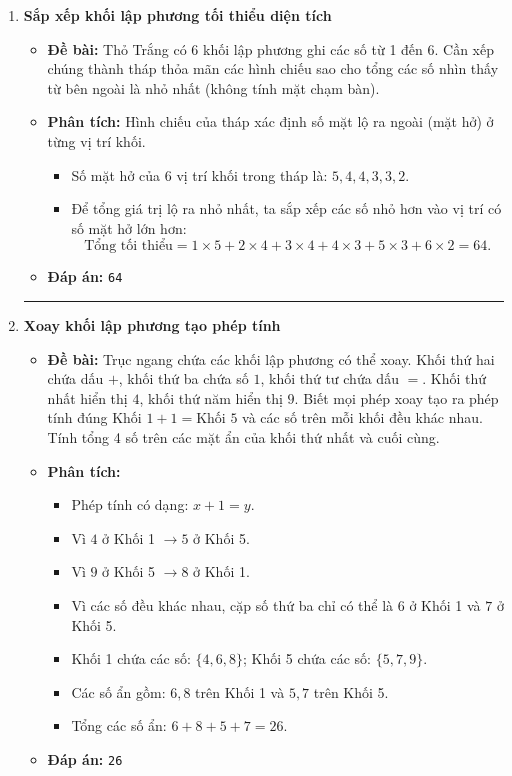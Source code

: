 \documentclass[11pt,a4paper]{article}
\begin{document}
\begin{enumerate}[label=\textbf{Câu \arabic*:}, leftmargin=*]
\item \textbf{Sắp xếp khối lập phương tối thiểu diện tích}
    \begin{itemize}
        \item \textbf{Đề bài:} Thỏ Trắng có 6 khối lập phương ghi các số từ 1 đến 6. Cần xếp chúng thành tháp thỏa mãn các hình chiếu sao cho tổng các số nhìn thấy từ bên ngoài là nhỏ nhất (không tính mặt chạm bàn).
        \item \textbf{Phân tích:}
            Hình chiếu của tháp xác định số mặt lộ ra ngoài (mặt hở) ở từng vị trí khối.
            \begin{itemize}
                \item Số mặt hở của 6 vị trí khối trong tháp là: $5, 4, 4, 3, 3, 2$.
                \item Để tổng giá trị lộ ra nhỏ nhất, ta sắp xếp các số nhỏ hơn vào vị trí có số mặt hở lớn hơn:
                    $$\text{Tổng tối thiểu} = 1 \times 5 + 2 \times 4 + 3 \times 4 + 4 \times 3 + 5 \times 3 + 6 \times 2 = 64.$$
            \end{itemize}
        \item \textbf{Đáp án:} \texttt{64}
    \end{itemize}

\hrule
\vspace{0.5cm}

\item \textbf{Xoay khối lập phương tạo phép tính}
    \begin{itemize}
        \item \textbf{Đề bài:} Trục ngang chứa các khối lập phương có thể xoay. Khối thứ hai chứa dấu $+$, khối thứ ba chứa số $1$, khối thứ tư chứa dấu $=$. Khối thứ nhất hiển thị $4$, khối thứ năm hiển thị $9$. Biết mọi phép xoay tạo ra phép tính đúng $\text{Khối 1} + 1 = \text{Khối 5}$ và các số trên mỗi khối đều khác nhau. Tính tổng 4 số trên các mặt ẩn của khối thứ nhất và cuối cùng.
        \item \textbf{Phân tích:}
            \begin{itemize}
                \item Phép tính có dạng: $x + 1 = y$.
                \item Vì $4$ ở Khối 1 $\to 5$ ở Khối 5.
                \item Vì $9$ ở Khối 5 $\to 8$ ở Khối 1.
                \item Vì các số đều khác nhau, cặp số thứ ba chỉ có thể là $6$ ở Khối 1 và $7$ ở Khối 5.
                \item Khối 1 chứa các số: $\{4, 6, 8\}$; Khối 5 chứa các số: $\{5, 7, 9\}$.
                \item Các số ẩn gồm: $6, 8$ trên Khối 1 và $5, 7$ trên Khối 5.
                \item Tổng các số ẩn: $6 + 8 + 5 + 7 = 26$.
            \end{itemize}
        \item \textbf{Đáp án:} \texttt{26}
    \end{itemize}


\end{enumerate}
\end{document}
